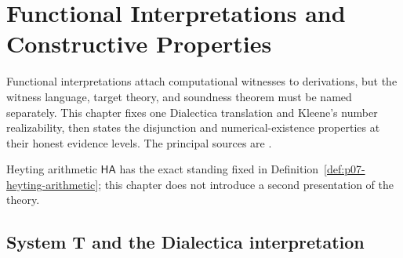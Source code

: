 
\chapter{Functional Interpretations and Constructive Properties}
\label{sec:p07-functional-interpretations}

Functional interpretations attach computational witnesses to derivations,
but the witness language, target theory, and soundness theorem must be named
separately.  This chapter fixes one Dialectica translation and Kleene's number
realizability, then states the disjunction and numerical-existence properties
at their honest evidence levels.  The principal sources are
\cite{Godel1958,Troelstra1973,AvigadFeferman1998,Kleene1945,
Troelstra1998,TroelstraVanDalen1988}.

Heyting arithmetic \(\mathsf{HA}\) has the exact standing fixed in
Definition~\ref{def:p07-heyting-arithmetic}; this chapter does not introduce a
second presentation of the theory.

\section{System T and the Dialectica interpretation}
\label{sec:p07-dialectica}

